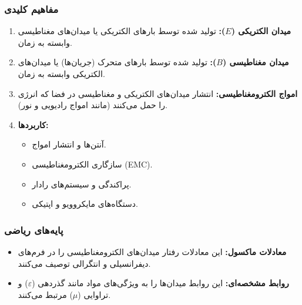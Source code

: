 \documentclass[12pt,a4paper]{article}
\begin{document}
\subsubsection{مفاهیم کلیدی}
\begin{enumerate}
    \item \textbf{میدان الکتریکی (\(E\)):} تولید شده توسط بارهای الکتریکی یا میدان‌های مغناطیسی وابسته به زمان.
    \item \textbf{میدان مغناطیسی (\(B\)):} تولید شده توسط بارهای متحرک (جریان‌ها) یا میدان‌های الکتریکی وابسته به زمان.
    \item \textbf{امواج الکترومغناطیسی:} انتشار میدان‌های الکتریکی و مغناطیسی در فضا که انرژی را حمل می‌کنند (مانند امواج رادیویی و نور).
    \item \textbf{کاربردها:}
          \begin{itemize}
              \item آنتن‌ها و انتشار امواج.
              \item سازگاری الکترومغناطیسی (EMC).
              \item پراکندگی و سیستم‌های رادار.
              \item دستگاه‌های مایکروویو و اپتیکی.
          \end{itemize}
\end{enumerate}

\subsubsection{پایه‌های ریاضی}
\begin{itemize}
    \item \textbf{معادلات ماکسول:} این معادلات رفتار میدان‌های الکترومغناطیسی را در فرم‌های دیفرانسیلی و انتگرالی توصیف می‌کنند.
    \item \textbf{روابط مشخصه‌ای:} این روابط میدان‌ها را به ویژگی‌های مواد مانند گذردهی ($\varepsilon$) و تراوایی ($\mu$) مرتبط می‌کنند.
\end{itemize}
\end{document}
